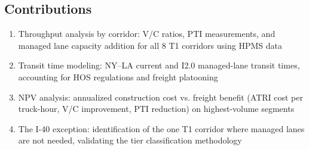 \subsection*{Contributions}

\begin{enumerate}
\item Throughput analysis by corridor: V/C ratios, PTI measurements, and managed lane capacity addition for all 8 T1 corridors using HPMS data
\item Transit time modeling: NY--LA current and I2.0 managed-lane transit times, accounting for HOS regulations and freight platooning
\item NPV analysis: annualized construction cost vs. freight benefit (ATRI cost per truck-hour, V/C improvement, PTI reduction) on highest-volume segments
\item The I-40 exception: identification of the one T1 corridor where managed lanes are not needed, validating the tier classification methodology
\end{enumerate}
